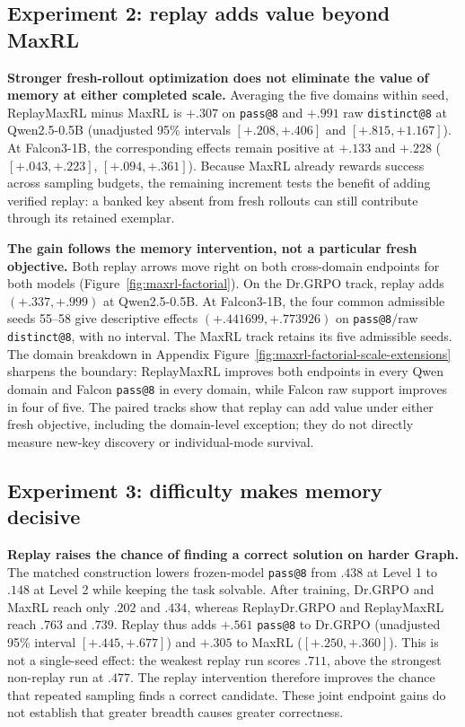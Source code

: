 \subsection{Experiment 2: replay adds value beyond MaxRL}
\label{app:results-maxrl}

\textbf{Stronger fresh-rollout optimization does not eliminate the value of
memory at either completed scale.} Averaging the five domains within seed,
ReplayMaxRL minus MaxRL is \(+.307\) on \texttt{pass@8} and \(+.991\) raw
\texttt{distinct@8} at Qwen2.5-0.5B (unadjusted 95\% intervals
\([+.208,+.406]\) and \([+.815,+1.167]\)). At Falcon3-1B, the corresponding
effects remain positive at \(+.133\) and \(+.228\)
(\([+.043,+.223]\), \([+.094,+.361]\)). Because MaxRL already rewards success
across sampling budgets, the remaining increment tests the benefit of adding
verified replay: a banked key absent from fresh rollouts can still contribute
through its retained exemplar.

\textbf{The gain follows the memory intervention, not a particular fresh
objective.} Both replay arrows move right on both cross-domain endpoints for
both models (Figure~\ref{fig:maxrl-factorial}). On the Dr.GRPO track, replay
adds \((+.337,+.999)\) at Qwen2.5-0.5B. At Falcon3-1B, the four common
admissible seeds 55--58 give descriptive effects
\((+.441699,+.773926)\) on \texttt{pass@8}/raw \texttt{distinct@8}, with no
interval. The MaxRL track retains its five admissible seeds. The domain breakdown in Appendix
Figure~\ref{fig:maxrl-factorial-scale-extensions} sharpens the boundary:
ReplayMaxRL improves both endpoints in every Qwen domain and Falcon
\texttt{pass@8} in every domain, while Falcon raw support improves in four of
five. The paired tracks show that replay can add value under either fresh
objective, including the domain-level exception; they do not directly measure
new-key discovery or individual-mode survival.

\subsection{Experiment 3: difficulty makes memory decisive}
\label{app:results-levels}

\textbf{Replay raises the chance of finding a correct solution on harder
Graph.} The matched construction lowers frozen-model \texttt{pass@8}
from \(.438\) at Level 1 to \(.148\) at Level 2 while keeping the task
solvable. After training, Dr.GRPO and MaxRL reach only \(.202\) and \(.434\),
whereas ReplayDr.GRPO and ReplayMaxRL reach \(.763\) and \(.739\). Replay thus
adds \(+.561\) \texttt{pass@8} to Dr.GRPO (unadjusted 95\% interval
\([+.445,+.677]\)) and \(+.305\) to MaxRL (\([+.250,+.360]\)). This is not a
single-seed effect: the weakest replay run scores \(.711\), above the strongest
non-replay run at \(.477\). The replay intervention therefore improves the
chance that repeated sampling finds a correct candidate. These joint endpoint
gains do not establish that greater breadth causes greater correctness.


